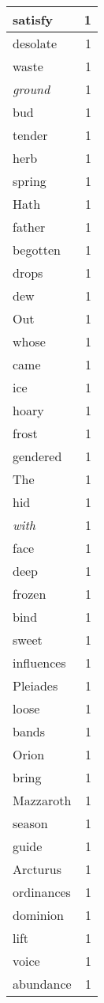 \begin{center}
\begin{longtable}{l|r}
satisfy & 1 \\ \hline
desolate & 1 \\ \hline
waste & 1 \\ \hline
\emph{ground} & 1 \\ \hline
bud & 1 \\ \hline
tender & 1 \\ \hline
herb & 1 \\ \hline
spring & 1 \\ \hline
Hath & 1 \\ \hline
father & 1 \\ \hline
begotten & 1 \\ \hline
drops & 1 \\ \hline
dew & 1 \\ \hline
Out & 1 \\ \hline
whose & 1 \\ \hline
came & 1 \\ \hline
ice & 1 \\ \hline
hoary & 1 \\ \hline
frost & 1 \\ \hline
gendered & 1 \\ \hline
The & 1 \\ \hline
hid & 1 \\ \hline
\emph{with} & 1 \\ \hline
face & 1 \\ \hline
deep & 1 \\ \hline
frozen & 1 \\ \hline
bind & 1 \\ \hline
sweet & 1 \\ \hline
influences & 1 \\ \hline
Pleiades & 1 \\ \hline
loose & 1 \\ \hline
bands & 1 \\ \hline
Orion & 1 \\ \hline
bring & 1 \\ \hline
Mazzaroth & 1 \\ \hline
season & 1 \\ \hline
guide & 1 \\ \hline
Arcturus & 1 \\ \hline
ordinances & 1 \\ \hline
dominion & 1 \\ \hline
lift & 1 \\ \hline
voice & 1 \\ \hline
abundance & 1 \\ \hline

\end{longtable}
\end{center}
